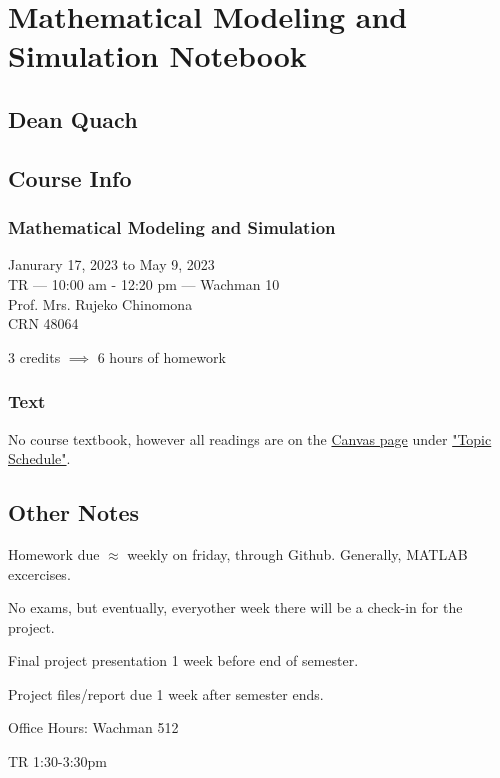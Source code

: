 \documentclass[12pt]{book}
\begin{document}
\frontmatter
%
\chapter*{\Huge \center Mathematical Modeling and Simulation Notebook}
\thispagestyle{empty}
\section*{\huge \center Dean Quach}



\newpage
\section*{\center \normalsize Course Info}
\subsection*{\center \normalsize Mathematical Modeling and Simulation}

\begin{center}
Janurary 17, 2023 to May 9, 2023\\
TR --- 10:00 am - 12:20 pm --- Wachman 10\\
Prof. Mrs. Rujeko Chinomona\\
CRN 48064

3 credits $\implies{}$ 6 hours of homework
\end{center}

\subsection*{\center \normalsize Text}
\begin{center}
No course textbook, however all readings are on the \href{https://templeu.instructure.com/courses/124350}{Canvas page} under \href{https://templeu.instructure.com/courses/124350/pages/topic-schedule}{"Topic Schedule"}.
\end{center}


\newpage
\section*{\center \normalsize Other Notes}
\begin{center}
Homework due $\approx$ weekly on friday, through Github. Generally, MATLAB excercises.

No exams, but eventually, everyother week there will be a check-in for the project.

Final project presentation 1 week before end of semester. 

Project files/report due 1 week after semester ends.\\
\end{center}
\vspace{50pt}
\begin{center}
Office Hours: Wachman 512

TR 1:30-3:30pm
\end{center}
\end{document}
